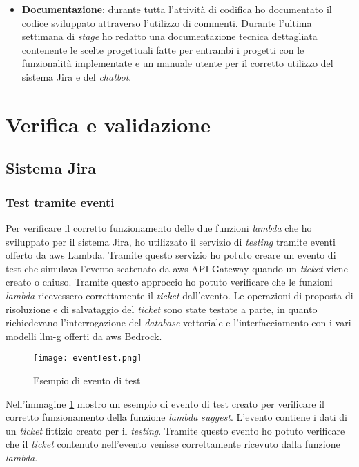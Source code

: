 \begin{itemize}
    \item \textbf{Documentazione}: durante tutta l'attività di codifica ho documentato il codice sviluppato attraverso l'utilizzo di commenti. Durante l'ultima settimana di \textit{stage} ho redatto una documentazione tecnica dettagliata contenente le scelte progettuali fatte per entrambi i progetti con le funzionalità implementate e un manuale utente per il corretto utilizzo del sistema Jira e del \textit{chatbot}. 
\end{itemize}

\section{Verifica e validazione}
\subsection{Sistema Jira}
\subsubsection{Test tramite eventi}
Per verificare il corretto funzionamento delle due funzioni \textit{lambda} che ho sviluppato per il sistema Jira, ho utilizzato il servizio di \textit{testing} tramite eventi offerto da \gls{aws} Lambda. Tramite questo servizio ho potuto creare un evento di test che simulava l'evento scatenato da \gls{aws} API Gateway quando un \textit{ticket} viene creato o chiuso. Tramite questo approccio ho potuto verificare che le funzioni \textit{lambda} ricevessero correttamente il \textit{ticket} dall'evento. Le operazioni di proposta di risoluzione e di salvataggio del \textit{ticket} sono state testate a parte, in quanto richiedevano l'interrogazione del \textit{database} vettoriale e l'interfacciamento con i vari modelli \gls{llm-g} offerti da \gls{aws} Bedrock. 
\begin{figure}[H]
    \centering
    \texttt{[image: eventTest.png]}
    \caption{Esempio di evento di test}
    \label{fig:testLambda}
\end{figure}
\noindent
Nell'immagine \ref{fig:testLambda} mostro un esempio di evento di test creato per verificare il corretto funzionamento della funzione \textit{lambda} \textit{suggest}. L'evento contiene i dati di un \textit{ticket} fittizio creato per il \textit{testing}. Tramite questo evento ho potuto verificare che il \textit{ticket} contenuto nell'evento venisse correttamente ricevuto dalla funzione \textit{lambda}.

